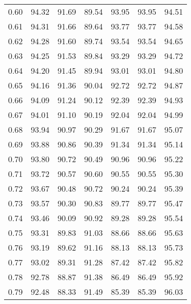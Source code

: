 \begin{tabular}{|c|c|c|c|c|c|c|}
      0.60 &     94.32 &     91.69 &      89.54 &   93.95 &      93.95 &         94.51 \\
      0.61 &     94.31 &     91.66 &      89.64 &   93.77 &      93.77 &         94.58 \\
      0.62 &     94.28 &     91.60 &      89.74 &   93.54 &      93.54 &         94.65 \\
      0.63 &     94.25 &     91.53 &      89.84 &   93.29 &      93.29 &         94.72 \\
      0.64 &     94.20 &     91.45 &      89.94 &   93.01 &      93.01 &         94.80 \\
      0.65 &     94.16 &     91.36 &      90.04 &   92.72 &      92.72 &         94.87 \\
      0.66 &     94.09 &     91.24 &      90.12 &   92.39 &      92.39 &         94.93 \\
      0.67 &     94.01 &     91.10 &      90.19 &   92.04 &      92.04 &         94.99 \\
      0.68 &     93.94 &     90.97 &      90.29 &   91.67 &      91.67 &         95.07 \\
      0.69 &     93.88 &     90.86 &      90.39 &   91.34 &      91.34 &         95.14 \\
      0.70 &     93.80 &     90.72 &      90.49 &   90.96 &      90.96 &         95.22 \\
      0.71 &     93.72 &     90.57 &      90.60 &   90.55 &      90.55 &         95.30 \\
      0.72 &     93.67 &     90.48 &      90.72 &   90.24 &      90.24 &         95.39 \\
      0.73 &     93.57 &     90.30 &      90.83 &   89.77 &      89.77 &         95.47 \\
      0.74 &     93.46 &     90.09 &      90.92 &   89.28 &      89.28 &         95.54 \\
      0.75 &     93.31 &     89.83 &      91.03 &   88.66 &      88.66 &         95.63 \\
      0.76 &     93.19 &     89.62 &      91.16 &   88.13 &      88.13 &         95.73 \\
      0.77 &     93.02 &     89.31 &      91.28 &   87.42 &      87.42 &         95.82 \\
      0.78 &     92.78 &     88.87 &      91.38 &   86.49 &      86.49 &         95.92 \\
      0.79 &     92.48 &     88.33 &      91.49 &   85.39 &      85.39 &         96.03 \\

\end{tabular}
